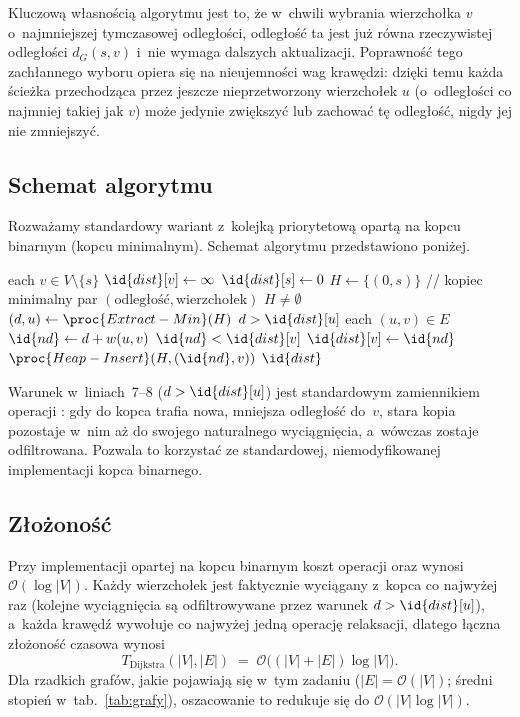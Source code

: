 \clearpage

Kluczową własnością algorytmu jest to, że w~chwili wybrania wierzchołka $v$
o~najmniejszej tymczasowej odległości, odległość ta jest już równa rzeczywistej
odległości $d_G(s,v)$ i~nie wymaga dalszych aktualizacji. Poprawność tego
zachłannego wyboru opiera się na nieujemności wag krawędzi: dzięki temu
każda ścieżka przechodząca przez jeszcze nieprzetworzony wierzchołek $u$
(o~odległości co najmniej takiej jak $v$) może jedynie zwiększyć lub
zachować tę odległość, nigdy jej nie zmniejszyć.

\subsection{Schemat algorytmu}

Rozważamy standardowy wariant z~kolejką priorytetową opartą na kopcu
binarnym (kopcu minimalnym). Schemat algorytmu przedstawiono poniżej.

\begin{codebox}
\li \For each $v \in V \setminus \{s\}$
\li \Do $\id{dist}[v] \gets \infty$
    \End
\li $\id{dist}[s] \gets 0$
\li $H \gets \{(0, s)\}$ \quad // kopiec minimalny par $(\text{odległość}, \text{wierzchołek})$
\li \While $H \neq \emptyset$
\li \Do $(d, u) \gets \proc{Extract-Min}(H)$
\li     \If $d > \id{dist}[u]$
\li     \Then {}
        \End
\li     \For each $(u, v) \in E$
\li     \Do $\id{nd} \gets d + w(u, v)$
\li         \If $\id{nd} < \id{dist}[v]$
\li         \Then $\id{dist}[v] \gets \id{nd}$
\li             $\proc{Heap-Insert}(H, (\id{nd}, v))$
            \End
        \End
    \End
\li \Return $\id{dist}$
\end{codebox}

Warunek w~liniach~7--8 ($d > \id{dist}[u]$) jest standardowym zamiennikiem
operacji : gdy do kopca trafia nowa, mniejsza
odległość do~$v$, stara kopia pozostaje w~nim aż do swojego naturalnego
wyciągnięcia, a~wówczas zostaje odfiltrowana. Pozwala to korzystać ze
standardowej, niemodyfikowanej implementacji kopca binarnego.

\subsection{Złożoność}

Przy implementacji opartej na kopcu binarnym koszt operacji
 oraz  wynosi $\mathcal{O}(\log|V|)$.
Każdy wierzchołek jest faktycznie wyciągany z~kopca co najwyżej raz (kolejne wyciągnięcia są odfiltrowywane przez warunek
$d>\id{dist}[u]$), a~każda krawędź wywołuje co najwyżej jedną operację relaksacji, dlatego łączna złożoność czasowa wynosi
\[
T_{\mathrm{Dijkstra}}(|V|,|E|) \;=\; \mathcal{O}\bigl((|V|+|E|)\log|V|\bigr).
\]
Dla rzadkich grafów, jakie pojawiają się w~tym zadaniu ($|E|=\mathcal{O}(|V|)$;
średni stopień w~tab.~\ref{tab:grafy}), oszacowanie to redukuje się do
$\mathcal{O}(|V|\log|V|)$.

